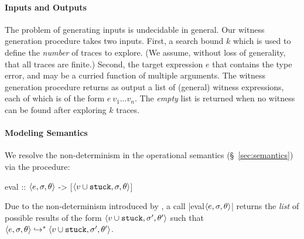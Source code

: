 \paragraph{Inputs and Outputs}
%
The problem of generating inputs is undecidable in general.
%
Our witness generation procedure takes two inputs.
%
First, a search bound $k$ which is used to define the \emph{number} of
traces to explore. (We assume, without loss of generality, that all
traces are finite.)
%
Second, the target expression $e$ that contains the type error, and may be a curried function of multiple arguments.
%
The witness generation procedure returns as output a list of (general)
witness expressions, each of which is of the form $e\ v_1 \ldots v_n$.
%
The \emph{empty} list is returned when no witness can be found after
exploring $k$ traces.
%

\paragraph{Modeling Semantics}
%
We resolve the non-determinism in the operational semantics
(\S~\ref{sec:semantics}) via the procedure:
%
\begin{mcode}
  eval :: $\langle e, \sigma, \theta \rangle$ -> [$\langle v \cup \mathtt{stuck}, \sigma, \theta \rangle$]
\end{mcode}
%
Due to the non-determinism introduced by \gensym, a call
\hbox{|eval$\langle e, \sigma, \theta \rangle$|} returns the \emph{list} of possible results
of the form $\langle v \cup \mathtt{stuck}, \sigma', \theta' \rangle$ such that
$\langle e, \sigma, \theta \rangle \hookrightarrow^{*} \langle v \cup \mathtt{stuck}, \sigma', \theta' \rangle{}$.
%


